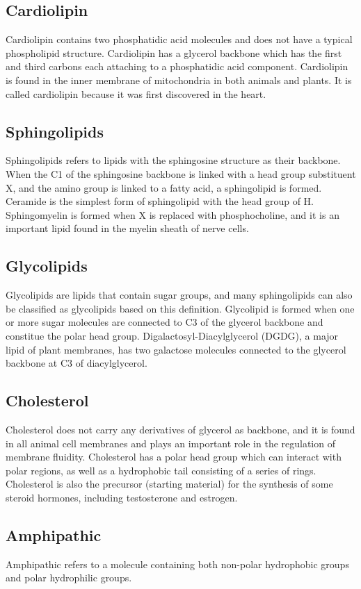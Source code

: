 \documentclass[11pt]{article}
\begin{document}
\subsection{Cardiolipin}
\label{sec:orge282423}
Cardiolipin contains two phosphatidic acid molecules and does not have a typical phospholipid structure. Cardiolipin has a glycerol backbone which has the first and third carbons each attaching to a phosphatidic acid component. Cardiolipin is found in the inner membrane of mitochondria in both animals and plants. It is called cardiolipin because it was first discovered in the heart.
\subsection{Sphingolipids}
\label{sec:orgb4785d4}
Sphingolipids refers to lipids with the sphingosine structure as their backbone. When the C1 of the sphingosine backbone is linked with a head group substituent X, and the amino group is linked to a fatty acid, a sphingolipid is formed. Ceramide is the simplest form of sphingolipid with the head group of H. Sphingomyelin is formed when X is replaced with phosphocholine, and it is an important lipid found in the myelin sheath of nerve cells.
\subsection{Glycolipids}
\label{sec:org92d6904}
Glycolipids are lipids that contain sugar groups, and many sphingolipids can also be classified as glycolipids based on this definition. Glycolipid is formed when one or more sugar molecules are connected to C3 of the glycerol backbone and constitue the polar head group. Digalactosyl-Diacylglycerol (DGDG), a major lipid of plant membranes, has two galactose molecules connected to the glycerol backbone at C3 of diacylglycerol.
\subsection{Cholesterol}
\label{sec:orgcb63bd8}
Cholesterol does not carry any derivatives of glycerol as backbone, and it is found in all animal cell membranes and plays an important role in the regulation of membrane fluidity. Cholesterol has a polar head group which can interact with polar regions, as well as a hydrophobic tail consisting of a series of rings. Cholesterol is also the precursor (starting material) for the synthesis of some steroid hormones, including testosterone and estrogen.
\subsection{Amphipathic}
\label{sec:org686d3fd}
Amphipathic refers to a molecule containing both non-polar hydrophobic groups and polar hydrophilic groups.
\end{document}
